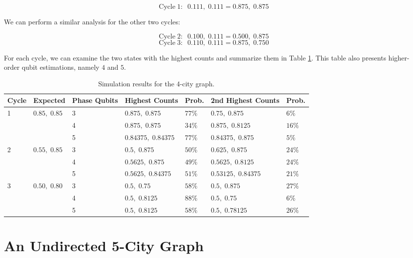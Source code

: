 \documentclass[msc,oneside]{ubcthesis}
\begin{document}
 $$\mathrm{Cycle}\; 1: \;\; 0.111, \; 0.111 = 0.875, \; 0.875$$
 
 We can perform a similar analysis for the other two cycles:
 
 $$\mathrm{Cycle}\; 2: \;\; 0.100, \; 0.111 = 0.500, \; 0.875$$
 $$\mathrm{Cycle}\; 3: \;\; 0.110, \; 0.111 = 0.875, \; 0.750$$
 
 For each cycle, we can examine the two states with the highest counts and summarize them in Table \ref{table:sim-results-4-city}. This table also presents higher-order qubit estimations, namely $4$ and $5$.
 
\begin{table}[ht!]
	\centering
	\begin{tabular}{lllllll} %
		\toprule
		Cycle & Expected & Phase Qubits & Highest Counts & Prob. & 2nd Highest Counts & Prob. \\
		\midrule
		\multirow{3}{*}{1} & \multirow{3}{*}{$0.85, \; 0.85$} & 3 & $0.875, \; 0.875$ & $77\%$ &  $0.75, \; 0.875$  & $6\%$ \\
		&                          & 4& $0.875, \; 0.875$ & $34\%$ &  $0.875, \; 0.8125$  & $16\%$ \\
		&                          & 5 & $0.84375, \; 0.84375$ & $77\%$ &  $0.84375, \; 0.875$  & $5\%$ \\
		\hline
		\multirow{3}{*}{2} & \multirow{3}{*}{$0.55, \; 0.85$} & 3 & $0.5, \; 0.875$ & $50\%$ &  $0.625, \; 0.875$  & $24\%$ \\
		&                          & 4& $0.5625, \; 0.875$ & $49\%$ &  $0.5625, \; 0.8125$  & $24\%$ \\
		&                          & 5 & $0.5625, \; 0.84375$ & $51\%$ &  $0.53125, \; 0.84375$  & $21\%$ \\
		\hline
		\multirow{3}{*}{3} & \multirow{3}{*}{$0.50, \; 0.80$ } & 3 & $0.5, \; 0.75$ & $58\%$ &  $0.5, \; 0.875$  & $27\%$ \\
		&                          & 4& $0.5, \; 0.8125$ & $88\%$ &  $0.5, \; 0.75$  & $6\%$ \\
		&                          & 5 & $0.5, \; 0.8125$ & $58\%$ &  $0.5, \; 0.78125$  & $26\%$ \\
		\bottomrule
	\end{tabular}
	\caption{Simulation results for the 4-city graph.}
	\label{table:sim-results-4-city}
\end{table} 

\clearpage


\section{An Undirected 5-City Graph}
\end{document}
